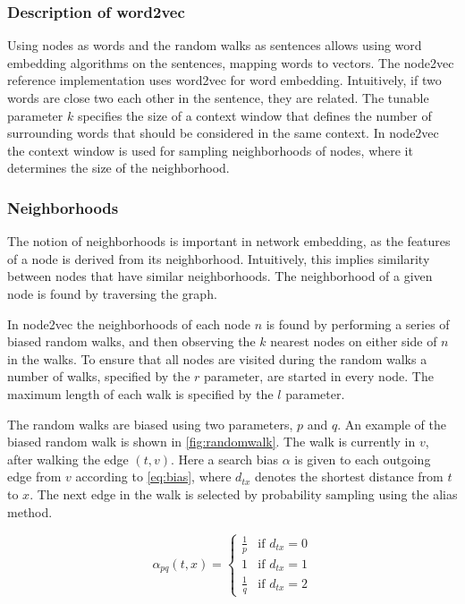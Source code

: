 \subsubsection{Description of word2vec}
Using nodes as words and the random walks as sentences allows using word embedding algorithms on the sentences, mapping words to vectors. The node2vec reference implementation uses word2vec for word embedding. Intuitively, if two words are close two each other in the sentence, they are related. The tunable parameter $k$ specifies the size of a context window that defines the number of surrounding words that should be considered in the same context. In node2vec the context window is used for sampling neighborhoods of nodes, where it determines the size of the neighborhood.

\subsubsection{Neighborhoods}
The notion of neighborhoods is important in network embedding, as the features of a node is derived from its neighborhood. Intuitively, this implies similarity between nodes that have similar neighborhoods. The neighborhood of a given node is found by traversing the graph.

In node2vec the neighborhoods of each node $n$ is found by performing a series of biased random walks, and then observing the $k$ nearest nodes on either side of $n$ in the walks. To ensure that all nodes are visited during the random walks a number of walks, specified by the $r$ parameter, are started in every node. The maximum length of each walk is specified by the $l$ parameter.

The random walks are biased using two parameters, $p$ and $q$. An example of the biased random walk is shown in \cref{fig:randomwalk}. The walk is currently in $v$, after walking the edge $(t,v)$. Here a search bias $\alpha$ is given to each outgoing edge from $v$ according to \cref{eq:bias}, where $d_{tx}$ denotes the shortest distance from $t$ to $x$. The next edge in the walk is selected by probability sampling using the alias method.

\begin{equation}
\label{eq:bias}
\alpha_{pq}(t,x)=
\begin{cases}
  \frac{1}{p} & \text{if } d_{tx}=0 \\
  1           & \text{if } d_{tx}=1 \\
  \frac{1}{q} & \text{if } d_{tx}=2
\end{cases}
\end{equation}

